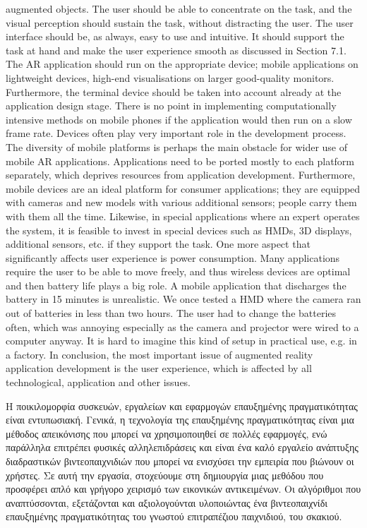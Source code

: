 augmented objects. The user should be able to concentrate on the task, and the visual perception should sustain the task, without distracting the user. The user interface should be, as always, easy to use and intuitive. It should support the task at hand and make the user experience smooth as discussed in Section 7.1. The AR application should run on the appropriate device; mobile applications on lightweight devices, high-end visualisations on larger good-quality monitors. Furthermore, the terminal device should be taken into account already at the application design stage. There is no point in implementing computationally intensive methods on mobile phones if the application would then run on a slow frame rate. Devices often play very important role in the development process. The diversity of mobile platforms is perhaps the main obstacle for wider use of mobile AR applications. Applications need to be ported mostly to each platform separately, which deprives resources from application development. Furthermore, mobile devices are an ideal platform for consumer applications; they are equipped with cameras and new models with various additional sensors; people carry them with them all the time. Likewise, in special applications where an expert operates the system, it is feasible to invest in special devices such as HMDs, 3D displays, additional sensors, etc. if they support the task. One more aspect that significantly affects user experience is power consumption. Many applications require the user to be able to move freely, and thus wireless devices are optimal and then battery life plays a big role. A mobile application that discharges the battery in 15 minutes is unrealistic. We once tested a HMD where the camera ran out of batteries in less than two hours. The user had to change the batteries often, which was annoying especially as the camera and projector were wired to a computer anyway. It is hard to imagine this kind of setup in practical use, e.g. in a factory. In conclusion, the most important issue of augmented reality application development is the user experience, which is affected by all technological, application and other issues.


Η ποικιλομορφία συσκευών, εργαλείων και εφαρμογών επαυξημένης πραγματικότητας είναι εντυπωσιακή. Γενικά, η τεχνολογία της επαυξημένης πραγματικότητας είναι μια μέθοδος απεικόνισης που μπορεί να χρησιμοποιηθεί σε πολλές εφαρμογές, ενώ παράλληλα επιτρέπει φυσικές αλληλεπιδράσεις και είναι ένα καλό εργαλείο ανάπτυξης διαδραστικών βιντεοπαιχνιδιών που μπορεί να ενισχύσει την εμπειρία που βιώνουν οι χρήστες. Σε αυτή την εργασία, στοχεύουμε στη δημιουργία μιας μεθόδου που προσφέρει απλό και γρήγορο χειρισμό των εικονικών αντικειμένων. Οι αλγόριθμοι που αναπτύσσονται, εξετάζονται και αξιολογούνται υλοποιώντας ένα βιντεοπαιχνίδι επαυξημένης πραγματικότητας του γνωστού επιτραπέζιου παιχνιδιού, του σκακιού.


